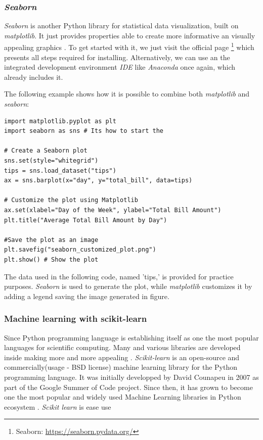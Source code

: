 \documentclass[12pt,a4paper]{report}
\begin{document}
\subsubsection*{\textit{Seaborn}}
\textit{Seaborn} is another Python library for statistical data visualization, built on \textit{matplotlib}. It just provides properties able to create more informative an visually appealing graphics \cite{sial2021comparative}. To get started with it, we just visit the official page \footnote{Seaborn: \url{https://seaborn.pydata.org/}} which presents all steps required for installing. Alternatively, we can use an  the integrated development environment \textit{IDE} like \textit{Anaconda} once again, which already includes it. 

The following example shows how it is possible to combine both \textit{matplotlib} and \textit{seaborn}:  
\begin{lstlisting}[style=stylepython]
import matplotlib.pyplot as plt 
import seaborn as sns # Its how to start the 

# Create a Seaborn plot
sns.set(style="whitegrid")
tips = sns.load_dataset("tips")
ax = sns.barplot(x="day", y="total_bill", data=tips)

# Customize the plot using Matplotlib
ax.set(xlabel="Day of the Week", ylabel="Total Bill Amount")
plt.title("Average Total Bill Amount by Day")

#Save the plot as an image
plt.savefig("seaborn_customized_plot.png")
plt.show() # Show the plot
\end{lstlisting} 
The data used in the following code, named 'tips,' is provided for practice purposes. \textit{Seaborn} is used to generate the plot, while \textit{matplotlib} customizes it by adding a legend saving the image generated in figure.


\subsubsection*{Machine learning with scikit-learn} 
Since Python programming language is establishing itself as one the most popular languages for scientific computing. Many and various libraries are developed inside making more and more appealing \cite{pedregosa2011scikit}. \newline
\textit{Scikit-learn} is an open-source and commercially(usage - BSD license) machine learning library for the Python programming language. It was initially developped by David Counapeu in 2007 as part of the Google Summer of Code project. Since then, it has grown to become one the most popular and widely used Machine Learning libraries in Python ecosystem \cite{scikitlearnCode1}.   
\textit{Scikit learn} is ease use 


\newpage


	
\newpage	
	
	
	
	
	
	
	
\end{document}
